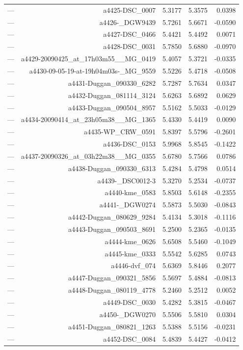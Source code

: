 \begin{table}[htbp]
\begin{tabular}{lrrrr}
— & a4425-DSC_0007 & 5.3177 & 5.3575 & 0.0398 \\
— & a4426-_DGW9439 & 5.7261 & 5.6671 & -0.0590 \\
— & a4427-DSC_0466 & 5.4421 & 5.4492 & 0.0071 \\
— & a4428-DSC_0031 & 5.7850 & 5.6880 & -0.0970 \\
— & a4429-20090425_at_17h03m55__MG_0419 & 5.4057 & 5.3721 & -0.0335 \\
— & a4430-09-05-19-at-19h04m03s-_MG_9559 & 5.5226 & 5.4718 & -0.0508 \\
— & a4431-Duggan_090330_6282 & 5.7287 & 5.7634 & 0.0347 \\
— & a4432-Duggan_081114_3124 & 5.6263 & 5.6892 & 0.0629 \\
— & a4433-Duggan_090504_8957 & 5.5162 & 5.5033 & -0.0129 \\
— & a4434-20090414_at_23h05m38__MG_1365 & 5.4330 & 5.4419 & 0.0090 \\
— & a4435-WP_CRW_0591 & 5.8397 & 5.5796 & -0.2601 \\
— & a4436-DSC_0153 & 5.9968 & 5.8545 & -0.1422 \\
— & a4437-20090326_at_03h22m38__MG_0355 & 5.6780 & 5.7566 & 0.0786 \\
— & a4438-Duggan_090330_6313 & 5.4284 & 5.4798 & 0.0514 \\
— & a4439-_DSC0012-3 & 5.3270 & 5.2534 & -0.0737 \\
— & a4440-kme_0583 & 5.8503 & 5.6148 & -0.2355 \\
— & a4441-_DGW0274 & 5.5873 & 5.5030 & -0.0843 \\
— & a4442-Duggan_080629_9284 & 5.4134 & 5.3018 & -0.1116 \\
— & a4443-Duggan_090503_8691 & 5.2500 & 5.2365 & -0.0135 \\
— & a4444-kme_0626 & 5.6508 & 5.5460 & -0.1049 \\
— & a4445-kme_0333 & 5.5542 & 5.6285 & 0.0743 \\
— & a4446-dvf_074 & 5.6369 & 5.8446 & 0.2077 \\
— & a4447-Duggan_090321_5856 & 5.5697 & 5.4884 & -0.0813 \\
— & a4448-Duggan_080119_4778 & 5.2460 & 5.2512 & 0.0052 \\
— & a4449-DSC_0030 & 5.4282 & 5.3815 & -0.0467 \\
— & a4450-_DGW0270 & 5.5506 & 5.5810 & 0.0304 \\
— & a4451-Duggan_080821_1263 & 5.5388 & 5.5156 & -0.0231 \\
— & a4452-DSC_0084 & 5.4839 & 5.4427 & -0.0412 \\

\end{tabular}
\end{table}
